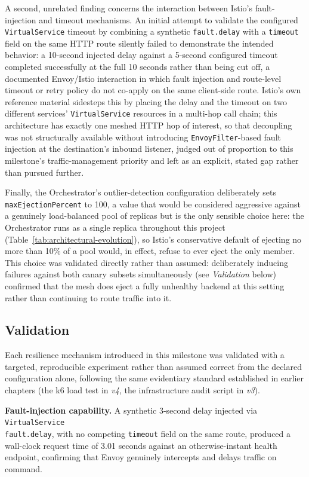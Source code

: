 \documentclass[twoside]{supsistudent}
\begin{document}
A second, unrelated finding concerns the interaction between Istio's fault-injection and timeout mechanisms. An initial attempt to validate the configured \texttt{VirtualService} timeout by combining a synthetic \texttt{fault.delay} with a \texttt{timeout} field on the same HTTP route silently failed to demonstrate the intended behavior: a 10-second injected delay against a 5-second configured timeout completed successfully at the full 10 seconds rather than being cut off, a documented Envoy/Istio interaction in which fault injection and route-level timeout or retry policy do not co-apply on the same client-side route. Istio's own reference material sidesteps this by placing the delay and the timeout on two different services' \texttt{VirtualService} resources in a multi-hop call chain; this architecture has exactly one meshed HTTP hop of interest, so that decoupling was not structurally available without introducing \texttt{EnvoyFilter}-based fault injection at the destination's inbound listener, judged out of proportion to this milestone's traffic-management priority and left as an explicit, stated gap rather than pursued further.

Finally, the Orchestrator's outlier-detection configuration deliberately sets \\ \texttt{maxEjectionPercent} to 100, a value that would be considered aggressive against a genuinely load-balanced pool of replicas but is the only sensible choice here: the Orchestrator runs as a single replica throughout this project (Table~\ref{tab:architectural-evolution}), so Istio's conservative default of ejecting no more than 10\% of a pool would, in effect, refuse to ever eject the only member. This choice was validated directly rather than assumed: deliberately inducing failures against both canary subsets simultaneously (see \emph{Validation} below) confirmed that the mesh does eject a fully unhealthy backend at this setting rather than continuing to route traffic into it.

\subsection{Validation}
Each resilience mechanism introduced in this milestone was validated with a targeted, reproducible experiment rather than assumed correct from the declared configuration alone, following the same evidentiary standard established in earlier chapters (the k6 load test in \emph{v4}, the infrastructure audit script in \emph{v3}).

\textbf{Fault-injection capability.} A synthetic 3-second delay injected via \texttt{VirtualService} \\ \texttt{fault.delay}, with no competing \texttt{timeout} field on the same route, produced a wall-clock request time of 3.01 seconds against an otherwise-instant health endpoint, confirming that Envoy genuinely intercepts and delays traffic on command.
\end{document}
